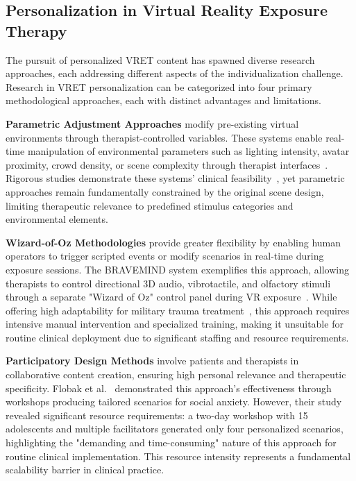 \documentclass[]{interact}
\begin{document}
\subsection{Personalization in Virtual Reality Exposure Therapy}

The pursuit of personalized VRET content has spawned diverse research approaches, each addressing different aspects of the individualization challenge. Research in VRET personalization can be categorized into four primary methodological approaches, each with distinct advantages and limitations.

\textbf{Parametric Adjustment Approaches} modify pre-existing virtual environments through therapist-controlled variables. These systems enable real-time manipulation of environmental parameters such as lighting intensity, avatar proximity, crowd density, or scene complexity through therapist interfaces~\cite{freeman2017virtual, mozgai2020vret}. Rigorous studies demonstrate these systems' clinical feasibility~\cite{botella2017recent}, yet parametric approaches remain fundamentally constrained by the original scene design, limiting therapeutic relevance to predefined stimulus categories and environmental elements.

\textbf{Wizard-of-Oz Methodologies} provide greater flexibility by enabling human operators to trigger scripted events or modify scenarios in real-time during exposure sessions. The BRAVEMIND system exemplifies this approach, allowing therapists to control directional 3D audio, vibrotactile, and olfactory stimuli through a separate "Wizard of Oz" control panel during VR exposure~\cite{rizzo2001virtual}. While offering high adaptability for military trauma treatment~\cite{mozgai2020iterative}, this approach requires intensive manual intervention and specialized training, making it unsuitable for routine clinical deployment due to significant staffing and resource requirements.

\textbf{Participatory Design Methods} involve patients and therapists in collaborative content creation, ensuring high personal relevance and therapeutic specificity. Flobak et al.~\cite{flobak2019participatory} demonstrated this approach's effectiveness through workshops producing tailored scenarios for social anxiety. However, their study revealed significant resource requirements: a two-day workshop with 15 adolescents and multiple facilitators generated only four personalized scenarios, highlighting the "demanding and time-consuming" nature of this approach for routine clinical implementation. This resource intensity represents a fundamental scalability barrier in clinical practice.
\end{document}

